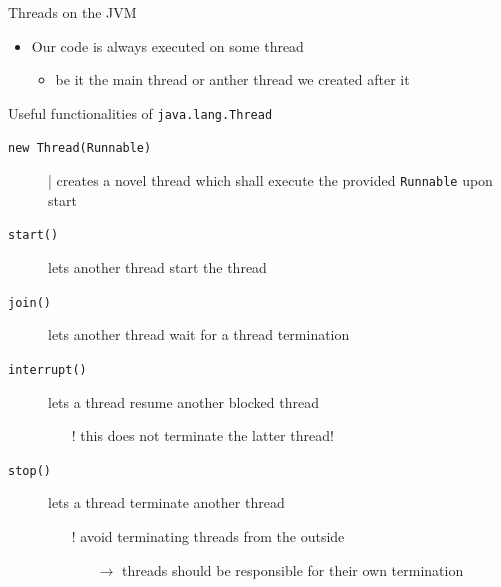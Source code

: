 \documentclass{beamer}\mode<presentation>{\usetheme{AMSBolognaFC}}
\begin{document}
\begin{frame}[allowframebreaks]
\begin{block}{Threads on the JVM}
\begin{itemize}
            \item Our code is always executed on some thread
            \begin{itemize}
                \item be it the main thread or anther thread we created after it
            \end{itemize}
        \end{itemize}
    \end{block}

    \begin{exampleblock}{Useful functionalities of \texttt{java.lang.Thread}}
        \begin{description}
            \item[\texttt{new Thread(Runnable)}] | creates a novel thread which shall execute the provided \texttt{Runnable} upon start

            \item[\texttt{start()}] lets another thread start the thread

            \item[\texttt{join()}] lets another thread wait for a thread termination

            \item[\texttt{interrupt()}] lets a thread resume another \alert{blocked} thread
            \begin{itemize}
                \item[!] this does not terminate the latter thread!
            \end{itemize}

            \item[\texttt{stop()}] lets a thread terminate another thread
            \begin{itemize}
                \item[!] avoid terminating threads from the outside
                \begin{itemize}
                    \item[$\rightarrow$] threads should be responsible for their own termination
                \end{itemize}
            \end{itemize}
        \end{description}
    \end{exampleblock}

    \framebreak

    


\end{frame}
\end{document}
